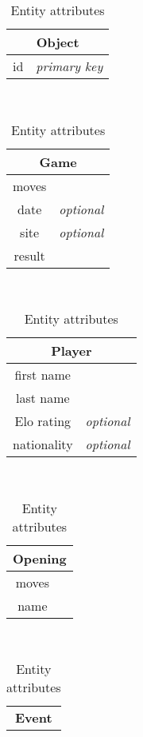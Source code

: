 \documentclass{article}
\begin{document}
\begin{table}[ht!]
    \caption{Entity attributes}
    \label{attr}
    
    \begin{subtable}{3.5cm}
	\begin{tabular}[t]{|cr|}
	\hline
	\multicolumn{2}{|c|}{\textbf{Object}} \\
	\hline 
	id & \em{primary key} \\
	\hline
	\end{tabular}
    \end{subtable}
    ~
    \begin{subtable}{3.5cm}
	\begin{tabular}[t]{|cr|}
	\hline
	\multicolumn{2}{|c|}{\textbf{Game}} \\
	\hline 
	moves  &                  \\
	date   & \em{optional}    \\
	site   & \em{optional}    \\
	result &                  \\
	\hline
	\end{tabular}
    \end{subtable}
    ~
    \begin{subtable}{3.5cm}
	\begin{tabular}[t]{|cr|}
	\hline
	\multicolumn{2}{|c|}{\textbf{Player}} \\
	\hline 
	first name   &                  \\
	last name    &                  \\
	Elo rating   & \em{optional}    \\
	nationality  & \em{optional}    \\
	\hline
	\end{tabular}
    \end{subtable}
    ~
    \begin{subtable}{3.5cm}
	\begin{tabular}[t]{|cr|}
	\hline
	\multicolumn{2}{|c|}{\textbf{Opening}} \\
	\hline
	moves  &                  \\
	name   &                  \\
	\hline
	\end{tabular}
    \end{subtable}
    ~
    \begin{subtable}{3.5cm}
	\begin{tabular}[t]{|cr|}
	\hline
	\multicolumn{2}{|c|}{\textbf{Event}} \\

\end{tabular}
\end{subtable}
\end{table}
\end{document}
